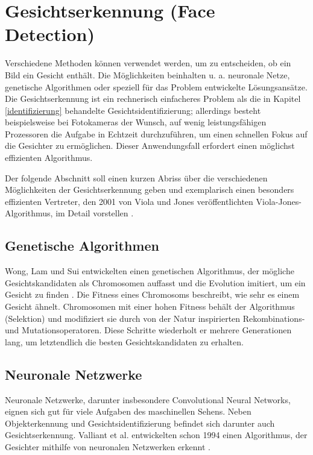 \documentclass[doktyp=semarbeit, sprache=german]{TUBAFarbeiten}
\begin{document}
\section{Gesichtserkennung (Face Detection)}

Verschiedene Methoden können verwendet werden, um zu entscheiden, ob ein Bild ein Gesicht enthält. Die Möglichkeiten beinhalten u. a. neuronale Netze, genetische Algorithmen oder speziell für das Problem entwickelte Lösungsansätze. Die Gesichtserkennung ist ein rechnerisch einfacheres Problem als die in Kapitel \ref{identifizierung} behandelte Gesichtsidentifizierung; allerdings besteht beispielsweise bei Fotokameras der Wunsch, auf wenig leistungsfähigen Prozessoren die Aufgabe in Echtzeit durchzuführen, um einen schnellen Fokus auf die Gesichter zu ermöglichen. Dieser Anwendungsfall erfordert einen möglichst effizienten Algorithmus.  

Der folgende Abschnitt soll einen kurzen Abriss über die verschiedenen Möglichkeiten der Gesichtserkennung geben und exemplarisch einen besonders effizienten Vertreter, den 2001 von Viola und Jones veröffentlichten Viola-Jones-Algorithmus, im Detail vorstellen \cite{Viola01rapidobject}.

\subsection{Genetische Algorithmen}
Wong, Lam und Sui entwickelten einen genetischen Algorithmus, der mögliche Gesichtskandidaten als Chromosomen auffasst und die Evolution imitiert, um ein Gesicht zu finden \cite{WONG20011993}. Die Fitness eines Chromosoms beschreibt, wie sehr es einem Gesicht ähnelt. Chromosomen mit einer hohen Fitness behält der Algorithmus (\glqq Selektion\grqq) und modifiziert sie durch von der Natur inspirierten Rekombinations- und Mutationsoperatoren. Diese Schritte wiederholt er mehrere Generationen lang, um letztendlich die besten Gesichtskandidaten zu erhalten.

\subsection{Neuronale Netzwerke}
Neuronale Netzwerke, darunter insbesondere Convolutional Neural Networks, eignen sich gut für viele Aufgaben des maschinellen Sehens. Neben Objekterkennung und Gesichtsidentifizierung befindet sich darunter auch Gesichtserkennung. Valliant et al. entwickelten schon 1994 einen Algorithmus, der Gesichter mithilfe von neuronalen Netzwerken erkennt \cite{Object}.
\end{document}
